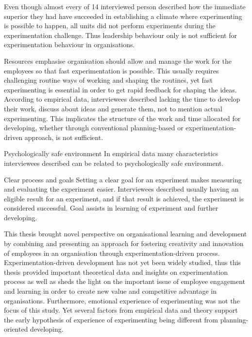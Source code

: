Even though almost every of 14 interviewed person described how the immediate superior they had have succeeded in establishing a climate where experimenting is possible to happen, all units did not perform experiments during the experimentation challenge. Thus leadership behaviour only is not sufficient for experimentation behaviour in organisations.

Resources \newline
\citet{thomke2001enlightened} emphasise organisation should allow and manage the work for the employees so that fast experimentation is possible. This usually requires challenging routine ways of working and shaping the routines, yet fast experimenting is essential in order to get rapid feedback for shaping the ideas. According to empirical data, interviewees described lacking the time to develop their work, discuss about ideas and generate them, not to mention actual experimenting. This implicates the structure of the work and time allocated for developing, whether through conventional planning-based or experimentation-driven approach, is not sufficient. 

Psychologically safe environment
\newline
In empirical data many characteristics interviewees described can be related to psychologically safe environment. 

Clear process and goals\newline
Setting a clear goal for an experiment makes measuring and evaluating the experiment easier. Interviewees described usually having an eligible result for an experiment, and if that result is achieved, the experiment is considered successful. Goal assists in learning of experiment and further developing. 

This thesis brought novel perspective on organisational learning and development by combining and presenting an approach for fostering creativity and innovation of employees in an organisation through experimentation-driven process. 
Experimentation-driven development has not yet been widely studied, thus this thesis provided important theoretical data and insights on experimentation process as well as sheds the light on the important issue of employee engagement and learning in order to create new value and competitive advantage in organisations. Furthermore, emotional experience of experimenting was not the focus of this study. Yet several factors from empirical data and theory support the early hypothesis of experience of experimenting being different from planning-oriented developing. 

